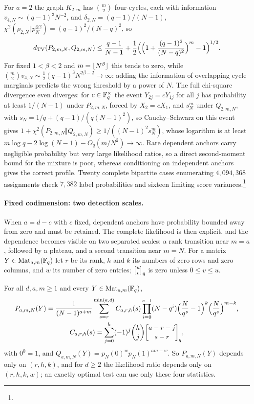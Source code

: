 For $a=2$ the graph $K_{2,m}$ has $\binom m2$ four-cycles, each with information
$v_{4,N}\sim(q-1)^3N^{-2}$, and $\delta_{2,N}=(q-1)/(N-1)$,
$\chi^2(\rho_{2,N}\Vert p_N^{\otimes2})=(q-1)^2/(N-q)^2$, so
\[
 d_{\mathrm{TV}}(P_{2,m,N},Q_{2,m,N})\le\frac{q-1}{N-1}+\frac12\Bigl(\Bigl(1+\frac{(q-1)^2}{(N-q)^2}\Bigr)^m-1\Bigr)^{1/2}.
\]
For fixed $1<\beta<2$ and $m=\lfloor N^\beta\rfloor$ this tends to zero, while
$\binom m2v_{4,N}\sim\frac12(q-1)^3N^{2\beta-2}\to\infty$: adding the information of overlapping cycle
marginals predicts the wrong threshold by a power of $N$. The full chi-square divergence even
diverges: for $c\in\mathbb{F}_q^\times$ the event $Y_{2j}=cY_{1j}$ for all $j$ has probability at least
$1/(N-1)$ under $P_{2,m,N}$, forced by $X_2=cX_1$, and $s_N^m$ under $Q_{2,m,N}$, with
$s_N=1/q+(q-1)/(q(N-1)^2)$, so Cauchy--Schwarz on this event gives
$1+\chi^2(P_{2,m,N}\Vert Q_{2,m,N})\ge1/((N-1)^2s_N^m)$, whose logarithm is at least
$m\log q-2\log(N-1)-O_q(m/N^2)\to\infty$. Rare dependent anchors carry negligible probability but
very large likelihood ratios, so a direct second-moment bound for the mixture is poor, whereas
conditioning on independent anchors gives the correct profile. Twenty complete bipartite cases
enumerating $4{,}094{,}368$ assignments check $7{,}382$ label probabilities and sixteen limiting score
variances.\footnote{}

\paragraph{Fixed codimension: two detection scales.}
When $a=d-c$ with $c$ fixed, dependent anchors have probability bounded away from zero and must be
retained. The complete likelihood is then explicit, and the dependence becomes visible on two separated
scales: a rank transition near $m=a$, followed by a plateau, and a second transition near $m=N$. For a
matrix $Y\in\operatorname{Mat}_{a,m}(\mathbb{F}_q)$ let $r$ be its rank, $h$ and $k$ its numbers of zero rows and zero
columns, and $w$ its number of zero entries; $\spnqbin uv{q}$ is zero unless $0\le v\le u$.

\begin{theorem}\label{spn:thm:anchors-exact}
For all $d,a,m\ge1$ and every $Y\in\operatorname{Mat}_{a,m}(\mathbb{F}_q)$,
\begin{gather*}
 P_{a,m,N}(Y)=\frac1{(N-1)^{a+m}}\sum_{s=r}^{\min(a,d)}C_{a,r,h}(s)\prod_{i=0}^{s-1}(N-q^i)
 \Bigl(\frac N{q^s}-1\Bigr)^k\Bigl(\frac N{q^s}\Bigr)^{m-k},\\
 C_{a,r,h}(s)=\sum_{j=0}^h(-1)^j\binom hj\spnqbin{a-r-j}{s-r}{q},
\end{gather*}
with $0^0=1$, and $Q_{a,m,N}(Y)=p_N(0)^wp_N(1)^{am-w}$. So $P_{a,m,N}(Y)$ depends only on $(r,h,k)$, and
for $d\ge2$ the likelihood ratio depends only on $(r,h,k,w)$; an exactly optimal test can use only these
four statistics.
\end{theorem}

